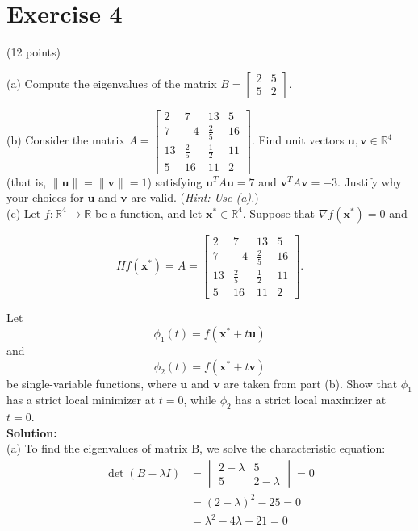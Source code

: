 \documentclass{article}
\begin{document}
\newpage

\section*{Exercise 4}
(12 points)

(a) Compute the eigenvalues of the matrix $B = \begin{bmatrix} 2 & 5 \\ 5 & 2 \end{bmatrix}$.

(b) Consider the matrix $A = \begin{bmatrix} 2 & 7 & 13 & 5 \\ 7 & -4 & \frac{2}{5} & 16 \\ 13 & \frac{2}{5} & \frac{1}{2} & 11 \\ 5 & 16 & 11 & 2 \end{bmatrix}$. Find unit vectors $\mathbf{u}, \mathbf{v} \in \mathbb{R}^4$ (that is, $\|\mathbf{u}\| = \|\mathbf{v}\| = 1$) satisfying $\mathbf{u}^T A\mathbf{u} = 7$ and $\mathbf{v}^T A\mathbf{v} = -3$. Justify why your choices for $\mathbf{u}$ and $\mathbf{v}$ are valid.
(\textit{Hint: Use (a).}) \\

(c) Let $f: \mathbb{R}^4 \to \mathbb{R}$ be a function, and let $\mathbf{x}^* \in \mathbb{R}^4$. Suppose that $\nabla f(\mathbf{x}^*) = 0$ and

$$Hf(\mathbf{x}^*) = A = \begin{bmatrix} 2 & 7 & 13 & 5 \\ 7 & -4 & \frac{2}{5} & 16 \\ 13 & \frac{2}{5} & \frac{1}{2} & 11 \\ 5 & 16 & 11 & 2 \end{bmatrix}.$$

Let $$\phi_1(t) = f(\mathbf{x}^* + t\mathbf{u})$$ and $$\phi_2(t) = f(\mathbf{x}^* + t\mathbf{v})$$ be single-variable functions, where $\mathbf{u}$ and $\mathbf{v}$ are taken from part (b). Show that $\phi_1$ has a strict local minimizer at $t = 0$, while $\phi_2$ has a strict local maximizer at $t = 0$. \\

\textbf{Solution: } \\

(a) To find the eigenvalues of matrix B, we solve the characteristic equation:
\begin{align*}
\det(B - \lambda I) &= \begin{vmatrix} 2-\lambda & 5 \\ 5 & 2-\lambda \end{vmatrix} = 0 \\
&= (2-\lambda)^2 - 25 = 0 \\
&= \lambda^2 - 4\lambda - 21 = 0
\end{align*}
\end{document}
